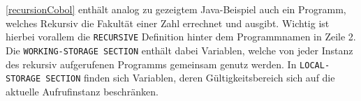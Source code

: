 
\autoref{recursionCobol} enthält analog zu gezeigtem Java-Beispiel auch ein Programm, welches Rekursiv die Fakultät einer Zahl errechnet und ausgibt. Wichtig ist hierbei vorallem die \texttt{RECURSIVE} Definition hinter dem Programmnamen in Zeile 2. Die \texttt{WORKING-STORAGE SECTION} enthält dabei Variablen, welche von jeder Instanz des rekursiv aufgerufenen Programms gemeinsam genutz werden. In \texttt{LOCAL-STORAGE SECTION} finden sich Variablen, deren Gültigkeitsbereich sich auf die aktuelle Aufrufinstanz beschränken.

